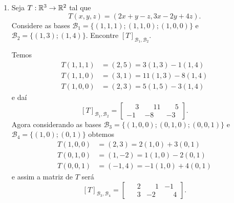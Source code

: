 \begin{exemplos}
\begin{enumerate}
		\item Seja $T : \mathbb{R}^3 \to \mathbb{R}^2$ tal que
		\[
			T(x,y,z) = (2x+y-z,3x-2y+4z).
		\]
		Considere as bases $\mathcal{B}_1 = \{(1,1,1);(1,1,0);(1,0,0)\}$ e $\mathcal{B}_2 = \{(1,3);(1,4)\}$. Encontre $[T]_{\mathcal{B}_{1},\mathcal{B}_{2}}$.
		\begin{solucao}
			Temos
			\begin{align*}
				T(1,1,1) &= (2,5) = 3(1,3) - 1(1,4)\\
				T(1,1,0) &= (3,1) = 11(1,3) - 8(1,4)\\
				T(1,0,0) &= (2,3) = 5(1,5) - 3(1,4)
			\end{align*}
			e daí
			\[
				[T]_{\mathcal{B}_{1},\mathcal{B}_{2}} = \begin{bmatrix}
					\phantom{-}3 & \phantom{-}11 & \phantom{-}5\\
					-1 & -8 & -3
				\end{bmatrix}.
			\]
			Agora considerando as bases $\mathcal{B}_3 = \{(1,0,0);(0,1,0);(0,0,1)\}$ e $\mathcal{B}_4 = \{(1,0);(0,1)\}$ obtemos
			\begin{align*}
				T(1,0,0) &= (2,3) = 2(1,0) + 3(0,1)\\
				T(0,1,0) &= (1,-2) = 1(1,0) - 2(0,1)\\
				T(0,0,1) &= (-1,4) = -1(1,0) + 4(0,1)
			\end{align*}
			e assim a matriz de $T$ será
			\[
				[T]_{\mathcal{B}_{3},\mathcal{B}_{4}} = \begin{bmatrix}
					\phantom{-}2 & \phantom{-}1 & -1\\
					\phantom{-}3 & -2 & \phantom{-}4
				\end{bmatrix}.
			\]
		\end{solucao}
	\end{enumerate}
\end{exemplos}

